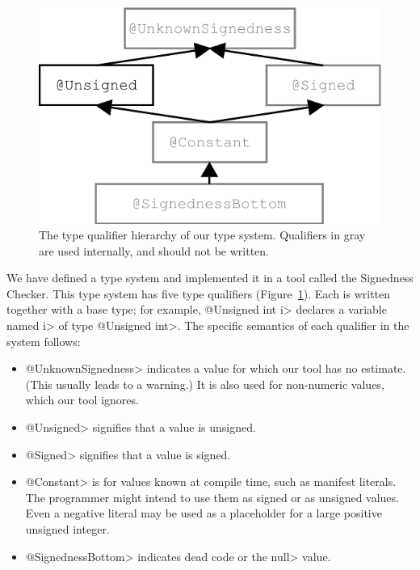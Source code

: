 \begin{figure}[t]
    \centering
    \includegraphics{signedness}
    \vspace{-10pt}
    \caption{The type qualifier hierarchy of our type system.
    Qualifiers in gray are used internally, and should not be written.}
    \label{fig:type-hierarchy}
\end{figure}

We have defined a type system and implemented it in a tool
called the Signedness Checker.
This type system has five type qualifiers
(Figure~\ref{fig:type-hierarchy}).  Each is written together
with a base type; for example, \<@Unsigned int i> declares a
variable named \<i> of type \<@Unsigned int>. The specific semantics of
each qualifier in the system follows:

\begin{itemize}\itemsep 0pt \parskip 0pt
  \item \<@UnknownSignedness> indicates a value for which our tool
   has no estimate.  (This usually leads to a
    warning.)  It is also used for non-numeric
    values, which our tool ignores.
  \item \<@Unsigned> signifies that a value is unsigned.
  \item \<@Signed> signifies that a value is signed.
  \item \<@Constant> is for values known at compile time, such as
    manifest literals.  The programmer might intend to
    use them as signed or as unsigned values.  Even a negative literal may
    be used as a placeholder for a large positive unsigned
    integer.
  \item \<@SignednessBottom> indicates dead code or the \<null> value.
\end{itemize}

